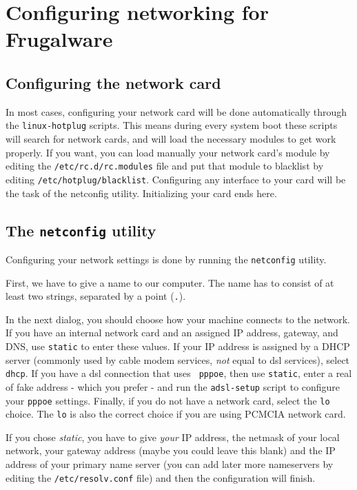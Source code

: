 \chapter{Configuring networking for Frugalware}
\section{Configuring the network card}

In most cases, configuring your network card will be done automatically through the {\tt linux-hotplug} scripts. This means during every system boot these scripts will search for network cards, and will load the necessary modules to get work properly. If you want, you can load manually your network card's module by editing the {\tt /etc/rc.d/rc.modules} file and put that module to blacklist by editing {\tt /etc/hotplug/blacklist}. Configuring any interface to your card will be the task of the netconfig utility. Initializing your card ends here.

\section{The {\tt netconfig} utility}
\label{section:netconfig}
Configuring your network settings is done by running the {\tt netconfig}
 utility.

First, we have to give a name to our computer. The name has to consist of at least two strings, separated by a point ({\tt .}).

In the next dialog, you should choose how your machine connects to the network.
If you have an internal network card and an assigned IP address, gateway, and
DNS, use {\tt static} to enter these values. If your IP address is assigned by
a DHCP server (commonly used by cable modem services, \textit{not} equal to dsl services), select {\tt dhcp}. If you have a dsl connection that uses {\tt
pppoe}, then use {\tt static}, enter a real of fake address - which you prefer
- and run the {\tt adsl-setup} script to configure your {\tt pppoe} settings.
Finally, if you do not have a network card, select the {\tt lo} choice. The
{\tt lo} is also the correct choice if you are using PCMCIA network card.

If you chose \textit{static}, you have to give \textit{your} IP address, the netmask of your local network, your gateway address (maybe you could leave this blank) and the IP address of your primary name server (you can add later more nameservers by editing the {\tt /etc/resolv.conf} file) and then the configuration will finish.

